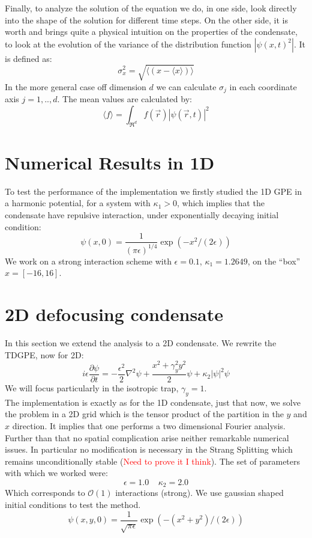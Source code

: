 \documentclass[a4paper,10pt]{article}
\begin{document}
Finally, to analyze the solution of the equation we do, in one side, look directly into the shape of the solution for different time steps. On the other side, it is worth and brings quite a physical intuition on the properties of the condensate, to look at the evolution of the variance of the distribution function $|\psi(x,t)^2|$. It is defined as:
\begin{equation}
 \sigma_x^2=\sqrt{\langle(x-\langle x\rangle)\rangle}
\end{equation} 
In the more general case off dimension $d$ we can calculate $\sigma_j$ in each coordinate axis $j={1,..,d}$. The mean values are calculated by:
\begin{equation}
 \langle f\rangle=\int_{\Re^d}f(\vec{r})|\psi(\vec{r},t)|^2
\end{equation}
\section{Numerical Results in 1D}
To test the performance of the implementation we firstly studied the 1D GPE in a harmonic potential, for a system with $\kappa_1>0$, which implies that the condensate have repulsive interaction, under exponentially decaying initial condition:
\begin{equation}
\psi(x,0)=\frac{1}{(\pi \epsilon)^{1/4}}\exp(-x^2/(2\epsilon)) 
\end{equation}
We work on a strong interaction scheme with $\epsilon=0.1$, $\kappa_1=1.2649$, on the ``box'' $x=[-16,16]$.


\section{2D defocusing condensate}
In this section we extend the analysis to a 2D condensate.
We rewrite the TDGPE, now for 2D:
\begin{equation}
 i \epsilon \frac{\partial \psi}{\partial t}=-\frac{\epsilon^2}{2}\nabla^2\psi+\frac{x^2+\gamma_{y}^2 y^2}{2}\psi+\kappa_2|\psi|^2\psi 
\end{equation}
We will focus particularly in the isotropic trap, $\gamma_y=1$.\\
The implementation is exactly as for the 1D condensate, just that now, we solve the problem in a 2D grid which is the tensor product of the partition in the $y$ and $x$ direction. It implies that one performs a two dimensional Fourier analysis. Further than that no spatial complication arise neither remarkable numerical issues. In particular no modification is necessary in the Strang Splitting which remains unconditionally stable (\textcolor{red}{Need to prove it I think}). The set of parameters with which we worked were: 
\begin{equation}
 \epsilon=1.0 \;\;\;\;\kappa_2=2.0
\end{equation}
Which corresponds to $\mathcal{O}(1)$ interactions (strong). We use gaussian shaped initial conditions to test the method. 
\begin{equation}
 \psi(x,y,0)=\frac{1}{\sqrt{\pi \epsilon}}\exp(-(x^2+y^2)/(2\epsilon))
\end{equation}
\end{document}
